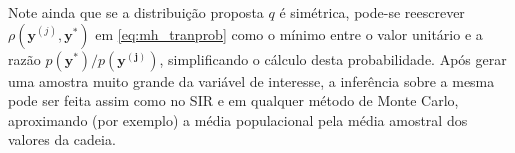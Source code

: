 \documentclass[12pt,reqno,a4paper,oneside]{article}
\begin{document}
Note ainda que se a distribuição proposta $q$ é simétrica, pode-se reescrever $\rho(\bm{y}^{(j)}, \bm{y}^*)$ em \eqref{eq:mh_tranprob} como o mínimo entre o valor unitário e a razão $p(\bm{y}^*)/p(\bm{y^{(j)}})$, simplificando o cálculo desta probabilidade. Após gerar uma amostra muito grande da variável de interesse, a inferência sobre a mesma pode ser feita assim como no SIR e em qualquer método de Monte Carlo, aproximando (por exemplo) a média populacional pela média amostral dos valores da cadeia.

\begin{figure}[t]%
	\centering
	\qquad

\end{figure}
\end{document}
